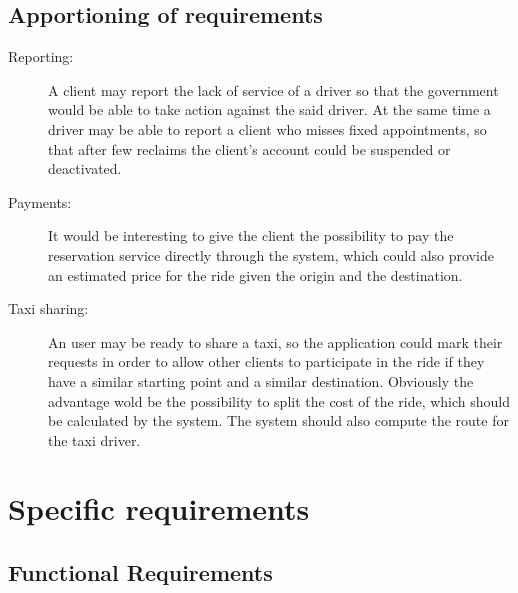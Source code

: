 \documentclass[a4paper]{article}
\begin{document}
\subsection{Apportioning of requirements}
\begin{description}
\item[Reporting:] A client may report the lack of service of a driver so that the government would be able to take action against the said driver. At the same time a driver may be able to report a client who misses fixed appointments, so that after few reclaims the client's account could be suspended or deactivated. 
\item[Payments:] It would be interesting to give the client the possibility to pay the reservation service directly through the system, which could also provide an estimated price for the ride given the origin and the destination.
\item[Taxi sharing:] An user may be ready to share a taxi, so the application could mark their requests in order to allow other clients to participate in the ride if they have a similar starting point and a similar destination. Obviously the advantage wold be the possibility to split the cost of the ride, which should be calculated by the system. The system should also compute the route for the taxi driver.
\end{description}

\section{Specific requirements}

\subsection{Functional Requirements}
\end{document}
